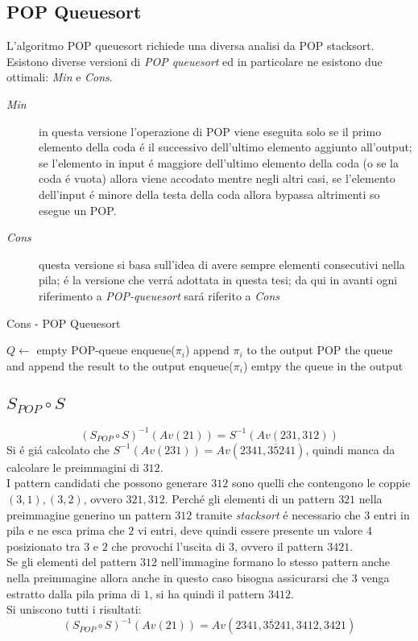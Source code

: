 \subsection*{POP Queuesort}L'algoritmo POP queuesort richiede una diversa analisi da POP stacksort.\\
Esistono diverse versioni di \textit{POP queuesort} ed in particolare ne esistono due ottimali\cite{cioni2021sorting}: \textit{Min} e \textit{Cons}.
\begin{description}
	\item[\textit{Min}] in questa versione l'operazione di POP viene eseguita solo se il primo elemento della coda \'e il successivo dell'ultimo elemento aggiunto all'output; se l'elemento in input \'e maggiore dell'ultimo elemento della coda (o se la coda \'e vuota) allora viene accodato mentre negli altri casi, se l'elemento dell'input \'e minore della testa della coda allora bypassa altrimenti so esegue un POP.
	\item[\textit{Cons}] questa versione si basa sull'idea di avere sempre elementi consecutivi nella pila; \'e la versione che verr\'a adottata in questa tesi; da qui in avanti ogni riferimento a \textit{POP-queuesort} sar\'a riferito a \textit{Cons}
\end{description}
\begin{algorithm}[H]
   \caption{Cons - POP Queuesort}
\begin{algorithmic}[1]
\State $Q\leftarrow$ empty POP-queue
		\State enqueue($\pi_i$)
	\Else
			\State append $\pi_i$ to the output
		\Else
			\State POP the queue and append the result to the output
			\State enqueue($\pi_i$)
		\EndIf
	\EndIf
\EndFor
\State emtpy the queue in the output
\end{algorithmic}
\end{algorithm}
\subsection*{$S_{POP}\circ{S}$}$$(S_{POP}\circ{S})^{-1}(Av(21))=S^{-1}(Av(231,312))$$
Si \'e gi\'a calcolato che $S^{-1}(Av(231))=Av(2341, 3\overline{5}241)$, quindi manca da calcolare le preimmagini di $312$.\\
I pattern candidati che possono generare $312$ sono quelli che contengono le coppie $(3,1),(3,2)$, ovvero $321, 312$.
Perch\'e gli elementi di un pattern $321$ nella preimmagine generino un pattern $312$ tramite \textit{stacksort} \'e necessario che $3$ entri in pila e ne esca prima che $2$ vi entri, deve quindi essere presente un valore $4$ posizionato tra $3$ e $2$ che provochi l'uscita di $3$, ovvero il pattern $3421$.\\
Se gli elementi del pattern $312$ nell'immagine formano lo stesso pattern anche nella preimmagine allora anche in questo caso bisogna assicurarsi che $3$ venga estratto dalla pila prima di $1$, si ha quindi il pattern $3412$.\\Si uniscono tutti i risultati:
$$(S_{POP}\circ{S})^{-1}(Av(21))=Av(2341, 3\overline{5}241, 3412, 3421)$$
